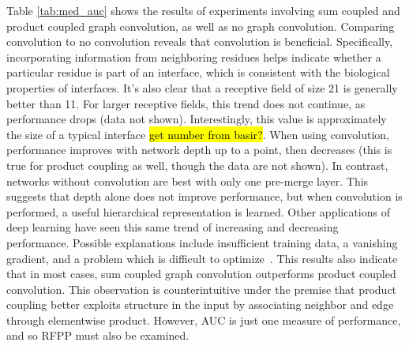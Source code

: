 Table \ref{tab:med_auc} shows the results of experiments involving sum coupled and product coupled graph convolution, as well as no graph convolution.
Comparing convolution to no convolution reveals that convolution is beneficial.
Specifically, incorporating information from neighboring residues helps indicate whether a particular residue is part of an interface, which is consistent with the biological properties of interfaces.
It's also clear that a receptive field of size 21 is generally better than 11.
For larger receptive fields, this trend does not continue, as performance drops (data not shown).
Interestingly, this value is approximately the size of a typical interface \hl{get number from basir?}.
When using convolution, performance improves with network depth up to a point, then decreases (this is true for product coupling as well, though the data are not shown).
In contrast, networks without convolution are best with only one pre-merge layer.
This suggests that depth alone does not improve performance, but when convolution is performed, a useful hierarchical representation is learned.
Other applications of deep learning have seen this same trend of increasing and decreasing performance.
Possible explanations include insufficient training data, a vanishing gradient, and a problem which is difficult to optimize~\cite{he2015}.
This results also indicate that in most cases, sum coupled graph convolution outperforms product coupled convolution.
This observation is counterintuitive under the premise that product coupling better exploits structure in the input by associating neighbor and edge through elementwise product.
However, AUC is just one measure of performance, and so RFPP must also be examined.
	
